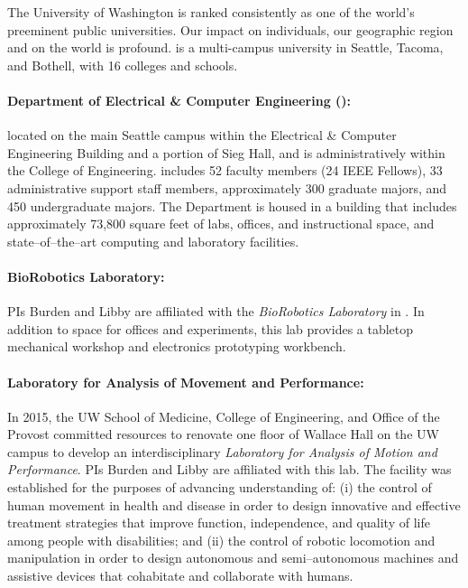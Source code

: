 \documentclass[11pt]{article}
\begin{document}
\pagebreak
\setcounter{page}{1}


The University of Washington is ranked consistently as one of the world's preeminent public universities.
Our impact on individuals, our geographic region and on the world is profound.
{\UW} is a multi-campus university in Seattle, Tacoma, and Bothell, with 16 colleges and schools.

\paragraph{{\UW} Department of Electrical \& Computer Engineering ({\UWECE}):} located on the main Seattle campus within the Electrical \& Computer Engineering Building and a portion of Sieg Hall, and is administratively within the College of Engineering.
{\UWEE} includes 52 faculty members (24 IEEE Fellows), 33 administrative support staff members, approximately 300 graduate majors, and 450 undergraduate majors.
The Department is housed in a building that includes approximately 73,800 square feet of labs, offices, and instructional space, and state--of--the--art computing and laboratory facilities.

\paragraph{BioRobotics Laboratory:} PIs Burden and Libby are affiliated with the \emph{BioRobotics Laboratory} in {\UWECE}.
%
In addition to space for offices and experiments, this lab provides a tabletop mechanical workshop and electronics prototyping workbench.

\paragraph{Laboratory for Analysis of Movement and Performance:}
In 2015, the UW School of Medicine, College of Engineering, and Office of the Provost committed resources to renovate one floor of Wallace Hall on the UW campus to develop an interdisciplinary \emph{Laboratory for Analysis of Motion and Performance}.
PIs Burden and Libby are affiliated with this lab.
The facility was established for the purposes of advancing understanding of: 
(i) the control of human movement in health and disease in order to design innovative and effective treatment strategies that improve function, independence, and quality of life among people with disabilities; 
and 
(ii) the control of robotic locomotion and manipulation in order to design autonomous and semi--autonomous machines and assistive devices that cohabitate and collaborate with humans.
\end{document}
